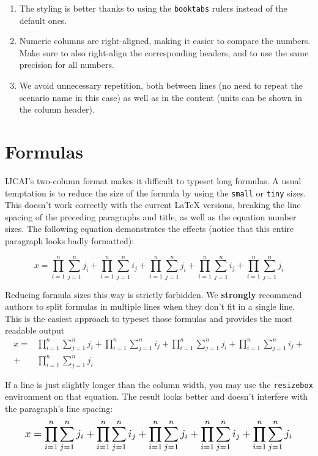 \documentclass{article}
\begin{document}
\begin{enumerate}
    \item The styling is better thanks to using the {\tt booktabs} rulers instead of the default ones.
    \item Numeric columns are right-aligned, making it easier to compare the numbers. Make sure to also right-align the corresponding headers, and to use the same precision for all numbers.
    \item We avoid unnecessary repetition, both between lines (no need to repeat the scenario name in this case) as well as in the content (units can be shown in the column header).
\end{enumerate}

\section{Formulas}

IJCAI's two-column format makes it difficult to typeset long formulas. A usual temptation is to reduce the size of the formula by using the {\tt small} or {\tt tiny} sizes. This doesn't work correctly with the current \LaTeX{} versions, breaking the line spacing of the preceding paragraphs and title, as well as the equation number sizes. The following equation demonstrates the effects (notice that this entire paragraph looks badly formatted):
%
\begin{tiny}
\begin{equation}
    x = \prod_{i=1}^n \sum_{j=1}^n j_i + \prod_{i=1}^n \sum_{j=1}^n i_j + \prod_{i=1}^n \sum_{j=1}^n j_i + \prod_{i=1}^n \sum_{j=1}^n i_j + \prod_{i=1}^n \sum_{j=1}^n j_i
\end{equation}
\end{tiny}%

Reducing formula sizes this way is strictly forbidden. We {\bf strongly} recommend authors to split formulas in multiple lines when they don't fit in a single line. This is the easiest approach to typeset those formulas and provides the most readable output%
%
\begin{align}
    x =& \prod_{i=1}^n \sum_{j=1}^n j_i + \prod_{i=1}^n \sum_{j=1}^n i_j + \prod_{i=1}^n \sum_{j=1}^n j_i + \prod_{i=1}^n \sum_{j=1}^n i_j + \nonumber\\
    + & \prod_{i=1}^n \sum_{j=1}^n j_i
\end{align}%

If a line is just slightly longer than the column width, you may use the {\tt resizebox} environment on that equation. The result looks better and doesn't interfere with the paragraph's line spacing: %
\begin{equation}
\resizebox{.91\linewidth}{!}{$
    \displaystyle
    x = \prod_{i=1}^n \sum_{j=1}^n j_i + \prod_{i=1}^n \sum_{j=1}^n i_j + \prod_{i=1}^n \sum_{j=1}^n j_i + \prod_{i=1}^n \sum_{j=1}^n i_j + \prod_{i=1}^n \sum_{j=1}^n j_i
$}
\end{equation}%
\end{document}
